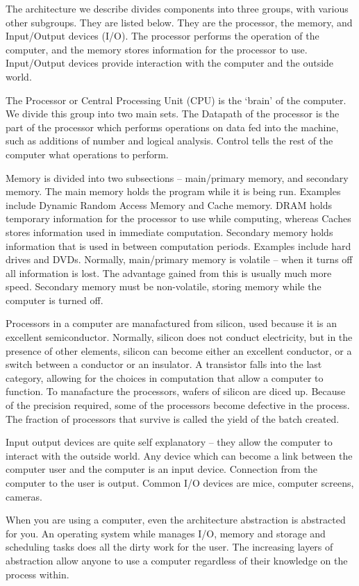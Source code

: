 \documentclass{report}
\begin{document}
The architecture we describe divides components into three groups, with various other subgroups. They are listed below. They are the processor, the memory, and Input/Output devices (I/O). The processor performs the operation of the computer, and the memory stores information for the processor to use. Input/Output devices provide interaction with the computer and the outside world.

The Processor or Central Processing Unit (CPU) is the `brain' of the computer. We divide this group into two main sets. The Datapath of the processor is the part of the processor which performs operations on data fed into the machine, such as additions of number and logical analysis. Control tells the rest of the computer what operations to perform.

Memory is divided into two subsections -- main/primary memory, and secondary memory. The main memory holds the program while it is being run. Examples include Dynamic Random Access Memory and Cache memory. DRAM holds temporary information for the processor to use while computing, whereas Caches stores information used in immediate computation. Secondary memory holds information that is used in between computation periods. Examples include hard drives and DVDs. Normally, main/primary memory is volatile -- when it turns off all information is lost. The advantage gained from this is usually much more speed. Secondary memory must be non-volatile, storing memory while the computer is turned off.

Processors in a computer are manafactured from silicon, used because it is an excellent semiconductor. Normally, silicon does not conduct electricity, but in the presence of other elements, silicon can become either an excellent conductor, or a switch between a conductor or an insulator. A transistor falls into the last category, allowing for the choices in computation that allow a computer to function. To manafacture the processors, wafers of silicon are diced up. Because of the precision required, some of the processors become defective in the process. The fraction of processors that survive is called the yield of the batch created.

Input output devices are quite self explanatory -- they allow the computer to interact with the outside world. Any device which can become a link between the computer user and the computer is an input device. Connection from the computer to the user is output. Common I/O devices are mice, computer screens, cameras.

When you are using a computer, even the architecture abstraction is abstracted for you. An operating system while manages I/O, memory and storage and scheduling tasks does all the dirty work for the user. The increasing layers of abstraction allow anyone to use a computer regardless of their knowledge on the process within.
\end{document}
